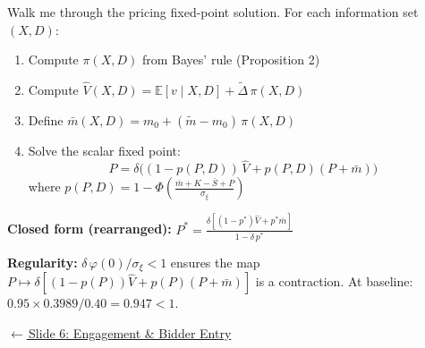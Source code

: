 \documentclass[aspectratio=169,10pt]{beamer}
\newcommand{\E}{\mathbb{E}}
\newcommand{\1}{\mathbf{1}}
\newcommand{\returnlink}[2]{%
  \par\vspace{0.2em}\hfill{\scriptsize\hyperlink{#1}{\textcolor{brightblue}{$\leftarrow$\,#2}}}%
}
\begin{document}
\begin{frame}{Walk me through the pricing fixed-point solution.}
\hypertarget{backup:fixed_point}{}
\small
For each information set $(X, D)$:

\begin{enumerate}\itemsep0.3em
  \item Compute $\pi(X, D)$ from Bayes' rule (Proposition 2)
  \item Compute $\hat{V}(X, D) = \E[v \mid X, D] + \tilde{\Delta}\,\pi(X, D)$
  \item Define $\bar{m}(X,D) = m_0 + (\tilde{m} - m_0)\,\pi(X,D)$
  \item Solve the scalar fixed point:
  \[
  P = \delta\big((1 - p(P, D))\,\hat{V} + p(P, D)(P + \bar{m})\big)
  \]
  where $p(P, D) = 1 - \Phi\!\left(\frac{\bar{m} + K - \bar{S} + P}{\sigma_\xi}\right)$
\end{enumerate}

\vspace{0.3em}

\textbf{Closed form (rearranged):} $P^* = \frac{\delta\left[(1-p^*)\hat{V} + p^*\bar{m}\right]}{1 - \delta\,p^*}$

\vspace{0.3em}

\textbf{Regularity:} $\delta\,\varphi(0)/\sigma_\xi < 1$ ensures the map $P \mapsto \delta[(1-p(P))\hat{V} + p(P)(P + \bar{m})]$ is a contraction. At baseline: $0.95 \times 0.3989 / 0.40 = 0.947 < 1$. \checkmark

\returnlink{main:engagement}{Slide 6: Engagement \& Bidder Entry}
\end{frame}
\end{document}
